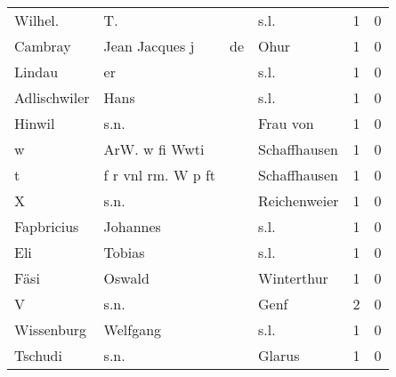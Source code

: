 \begin{tabular}{llllrr}
                  Wilhel. &                                 T. &             &                                        s.l. &          1 &         0 \\
                  Cambray &                     Jean Jacques j &          de &                                        Ohur &          1 &         0 \\
                   Lindau &                                 er &             &                                        s.l. &          1 &         0 \\
             Adlischwiler &                               Hans &             &                                        s.l. &          1 &         0 \\
                   Hinwil &                               s.n. &             &                                    Frau von &          1 &         0 \\
                        w &                     ArW. w fi Wwti &             &                                Schaffhausen &          1 &         0 \\
                        t &                 f r vnl rm. W p ft &             &                                Schaffhausen &          1 &         0 \\
                        X &                               s.n. &             &                                Reichenweier &          1 &         0 \\
               Fapbricius &                           Johannes &             &                                        s.l. &          1 &         0 \\
                      Eli &                             Tobias &             &                                        s.l. &          1 &         0 \\
                     Fäsi &                             Oswald &             &                                  Winterthur &          1 &         0 \\
                        V &                               s.n. &             &                                        Genf &          2 &         0 \\
               Wissenburg &                           Welfgang &             &                                        s.l. &          1 &         0 \\
                  Tschudi &                               s.n. &             &                                      Glarus &          1 &         0 \\

\end{tabular}
